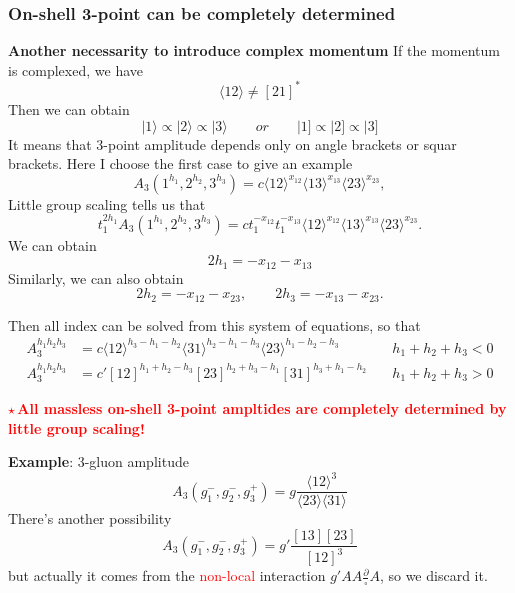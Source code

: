 \documentclass{beamer}
\newcommand{\aket}[1]{|#1\rangle}
\newcommand{\sket}[1]{|#1]}
\newcommand{\avg}[1]{\langle #1 \rangle}
\begin{document}
\begin{frame}
    \frametitle{ On-shell 3-point can be completely determined}
    \textbf{Another necessarity to introduce complex momentum}
    If the momentum is complexed, we have 
    \begin{equation*}
        \avg{12}\neq[21]^*
    \end{equation*}
    Then we can obtain
    \begin{equation*}
        \aket{1}\propto \aket{2}\propto \aket{3} \qquad or \qquad \sket{1}\propto \sket{2}\propto \sket{3}
    \end{equation*}
    It means that 3-point amplitude depends only on angle brackets or squar brackets. Here I choose the first case to give an example
    \begin{equation*}
        A_3(1^{h_1},2^{h_2},3^{h_3})=c\avg{12}^{x_{12}}\avg{13}^{x_{13}}\avg{23}^{x_{23}},
    \end{equation*}
    Little group scaling tells us that
    \begin{equation*}
        t_1^{2h_1} A_3(1^{h_1},2^{h_2},3^{h_3})=ct_1^{-x_{12}}t_1^{-x_{13}}\avg{12}^{x_{12}}\avg{13}^{x_{13}}\avg{23}^{x_{23}}.
    \end{equation*}
    We can obtain
    \begin{equation*}
        2h_1=-x_{12}-x_{13}
    \end{equation*}
    Similarly, we can also obtain
    \begin{equation*}
        2h_2=-x_{12}-x_{23},\qquad 2h_3=-x_{13}-x_{23}.
    \end{equation*}
\end{frame}

\begin{frame}
    Then all index can be solved from this system of equations, so that
    \[
    \boxed{
    \begin{aligned}
        A_3^{h_1h_2h_3} &= c\avg{12}^{h_3-h_1-h_2}\avg{31}^{h_2-h_1-h_3}\avg{23}^{h_1-h_2-h_3}
        \quad & h_1+h_2+h_3 < 0 \\[0.5em]
        A_3^{h_1h_2h_3} &= c' [12]^{h_1+h_2-h_3}[23]^{h_2+h_3-h_1}[31]^{h_3+h_1-h_2}
        \quad & h_1+h_2+h_3 > 0
    \end{aligned}
        }
    \]

    \textbf{\textcolor{red}{$\star$\,All massless on-shell 3-point ampltides are completely determined by little group scaling!}}
    
    \textbf{Example}: 3-gluon amplitude\\
    \begin{equation*}
        A_3(g_1^-,g_2^-,g_3^+)=g\frac{\avg{12}^3}{\avg{23}\!\avg{31}}
    \end{equation*}
    There's another possibility 
    \begin{equation*}
        A_3(g_1^-,g_2^-,g_3^+)=g'\frac{[13][23]}{[12]^3}
    \end{equation*}
    but actually it comes from the \textcolor{red}{non-local} interaction $g'AA\frac{\partial}{\square}A$, so we discard it.
\end{frame}
\end{document}
